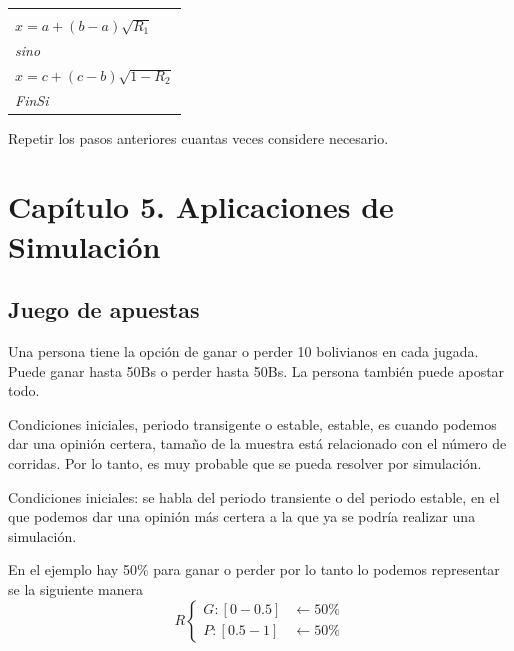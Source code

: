 \documentclass[11pt,letterpaper]{report}
\newenvironment{algoritmo}
  {\begin{center}\begin{tabular}{|p{0.85\textwidth}|}\hline\vspace{-0.2cm}\begin{tabbing}\hspace{0.6cm}\=\hspace{0.6cm}\=\hspace{0.6cm}\=\hspace{0.6cm}\=\hspace{0.6cm}\=\kill}
  {\end{tabbing}\vspace{-0.4cm}\\\hline\end{tabular}\end{center}}
\begin{document}
\begin{algoritmo}
\>\textit{Si} $\left(R_1 < \frac{b-a}{c-a}\right)$\\
\>\>$x = a + (b-a)\sqrt{R_1}$\\
\>\textit{sino}\\
\>\>$x = c + (c-b)\sqrt{1 - R_2}$\\
\>\textit{FinSi}
\end{algoritmo}

Repetir los pasos anteriores cuantas veces considere necesario.

\section*{Capítulo 5. Aplicaciones de Simulación}

\subsection*{Juego de apuestas}

Una persona tiene la opción de ganar o perder 10 bolivianos en cada jugada. Puede ganar hasta 50Bs o perder hasta 50Bs. La persona también puede apostar todo.

\begin{center}
\end{center}

Condiciones iniciales, periodo transigente o estable, estable, es cuando podemos dar una opinión certera, tamaño de la muestra está relacionado con el número de corridas. Por lo tanto, es muy probable que se pueda resolver por simulación.

Condiciones iniciales: se habla del periodo transiente o del periodo estable, en el que podemos dar una opinión más certera a la que ya se podría realizar una simulación.

En el ejemplo hay 50\% para ganar o perder por lo tanto lo podemos representar se la siguiente manera
\[
R
\begin{cases}
G: [0 - 0.5] & \leftarrow 50\%\\
P: [0.5 - 1] & \leftarrow 50\%
\end{cases}
\]
\end{document}
